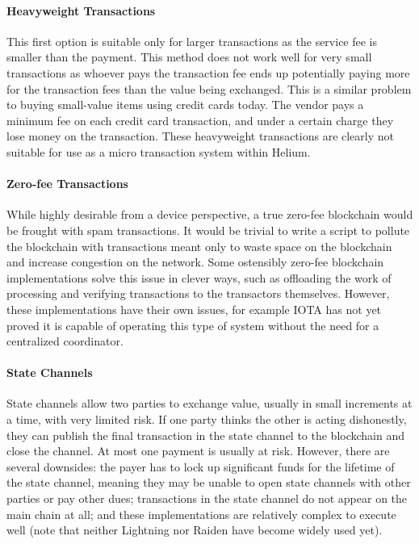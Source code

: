 \documentclass[UTF8, 10pt, nonatbib, nocopyrightspace, reprint]{sigplanconf}
\begin{document}
\paragraph{Heavyweight Transactions}
This first option is suitable only for larger transactions as the service fee is smaller than the payment. This method does not work well for very small transactions as whoever pays the transaction fee ends up potentially paying more for the transaction fees than the value being exchanged. This is a similar problem to buying small-value items using credit cards today. The vendor pays a minimum fee on each credit card transaction, and under a certain charge they lose money on the transaction. These heavyweight transactions are clearly not suitable for use as a micro transaction system within Helium.

\paragraph{Zero-fee Transactions}
While highly desirable from a device perspective, a true zero-fee blockchain would be frought with spam transactions. It would be trivial to write a script to pollute the blockchain with transactions meant only to waste space on the blockchain and increase congestion on the network. Some ostensibly zero-fee blockchain implementations solve this issue in clever ways, such as offloading the work of processing and verifying transactions to the transactors themselves. However, these implementations have their own issues, for example IOTA \cite{iota} has not yet proved it is capable of operating this type of system without the need for a centralized coordinator.

\paragraph{State Channels}
State channels \cite{state-channels} allow two parties to exchange value, usually in small increments at a time, with very limited risk. If one party thinks the other is acting dishonestly, they can publish the final transaction in the state channel to the blockchain and close the channel. At most one payment is usually at risk. However, there are several downsides: the payer has to lock up significant funds for the lifetime of the state channel, meaning they may be unable to open state channels with other parties or pay other dues; transactions in the state channel do not appear on the main chain at all; and these implementations are relatively complex to execute well (note that neither Lightning \cite{lightning} nor Raiden \cite{raiden} have become widely used yet).
\end{document}
